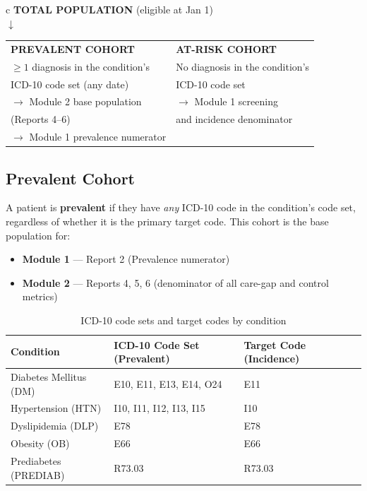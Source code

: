 \documentclass[11pt,a4paper]{article}
\begin{document}
\begin{center}
\begin{tabular}{c}
\textbf{TOTAL POPULATION} (eligible at Jan 1) \\
$\downarrow$ \\
\begin{tabular}{p{} p{}}
\quad \textbf{PREVALENT COHORT} & \quad \textbf{AT-RISK COHORT} \\
\quad $\geq 1$ diagnosis in the condition's & \quad No diagnosis in the condition's \\
\quad ICD-10 code set (any date) & \quad ICD-10 code set \\
\quad $\rightarrow$ Module 2 base population & \quad $\rightarrow$ Module 1 screening \\
\quad \quad (Reports 4--6) & \quad \quad and incidence denominator \\
\quad $\rightarrow$ Module 1 prevalence numerator & \\
\end{tabular}
\end{tabular}
\end{center}

\subsection{Prevalent Cohort}

A patient is \textbf{prevalent} if they have \textit{any} ICD-10 code in the condition's code set, regardless of whether it is the primary target code. This cohort is the base population for:

\begin{itemize}[leftmargin=*]
    \item \textbf{Module 1} --- Report 2 (Prevalence numerator)
    \item \textbf{Module 2} --- Reports 4, 5, 6 (denominator of all care-gap and control metrics)
\end{itemize}

\begin{table}[ht]
\centering
\caption{ICD-10 code sets and target codes by condition}
\begin{tabular}{@{}llll@{}}
\toprule
\textbf{Condition} & \textbf{ICD-10 Code Set (Prevalent)} & \textbf{Target Code (Incidence)} \\
\midrule
Diabetes Mellitus (DM) & E10, E11, E13, E14, O24 & E11 \\
Hypertension (HTN) & I10, I11, I12, I13, I15 & I10 \\
Dyslipidemia (DLP) & E78 & E78 \\
Obesity (OB) & E66 & E66 \\
Prediabetes (PREDIAB) & R73.03 & R73.03 \\
\bottomrule
\end{tabular}
\end{table}
\end{document}
